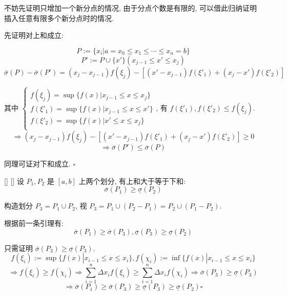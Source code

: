 \documentclass[UTF8]{ctexart}
\begin{document}
            \begin{prf}

                不妨先证明只增加一个新分点的情况, 由于分点个数是有限的, 可以借此归纳证明插入任意有限多个新分点时的情况. 

                先证明对上和成立: 

                \[P:=\{x_i|a=x_0\leq x_1\leq\cdots\leq x_n=b\}\]
                \[P':=P\cup\{x'\}(x_{j-1}\leq x'\leq x_j)\]
                \[\overline{\sigma}(P)-\overline{\sigma}(P')=(x_j-x_{j-1})f(\xi_j)-[(x'-x_{j-1})f(\xi'_1)+(x_j-x')f(\xi'_2)]\]
                
                其中
                \(\begin{cases}
                    f(\xi_j)=\sup\{f(x)|x_{j-1}\leq x\leq x_j\}\\
                    f(\xi'_1)=\sup\{f(x)|x_{j-1}\leq x\leq x'\}\\
                    f(\xi'_2)=\sup\{f(x)|x'\leq x\leq x_j\}\\
                \end{cases}\), 有 \(f(\xi'_1),f(\xi'_2)\leq f(\xi_j)\). 
                \[\Longrightarrow(x_j-x_{j-1})f(\xi_j)-[(x'-x_{j-1})f(\xi'_1)+(x_j-x')f(\xi'_2)]\geq 0\]
                \[\Longrightarrow\overline{\sigma}(P')\leq\overline{\sigma}(P)\]

                同理可证对下和成立. \(\square\)
            \end{prf}
            
            \begin{ppt}
			    []
			    {}
			    []
			    []
                设 \(P_1, P_2\) 是 \([a,b]\) 上两个划分, 有上和大于等于下和: 
                \[\overline{\sigma}(P_1)\geq\underline{\sigma}(P_2)\]
            \end{ppt}

            \begin{prf}

                构造划分 \(P_3=P_1\cup P_2\), 视 \(P_3=P_1\cup(P_2-P_1)=P_2\cup(P_1-P_2)\). 
                
                根据前一条引理有: 
                \[\overline{\sigma}(P_1)\geq\overline{\sigma}(P_3), \underline{\sigma}(P_3)\geq\underline{\sigma}(P_2)\]

                只需证明 \(\overline{\sigma}(P_3)\geq\underline{\sigma}(P_3)\). 
                \[f(\xi_i):=\sup\{f(x)|x_{i-1}\leq x\leq x_i\}, f(\chi_i):=\inf\{f(x)|x_{i-1}\leq x\leq x_i\}\]
                \[\Longrightarrow f(\xi_i)\geq f(\chi_i)\Longrightarrow\sum_{i=1}^{n}\Delta x_if(\xi_i)\geq\sum_{i=1}^{n}\Delta x_if(\chi_i)\Longrightarrow\overline{\sigma}(P_3)\geq\underline{\sigma}(P_3)\]
                \[\Longrightarrow\overline{\sigma}(P_1)\geq\overline{\sigma}(P_3)\geq\underline{\sigma}(P_3)\geq\underline{\sigma}(P_2)\square\]
            \end{prf}
        
\end{document}
